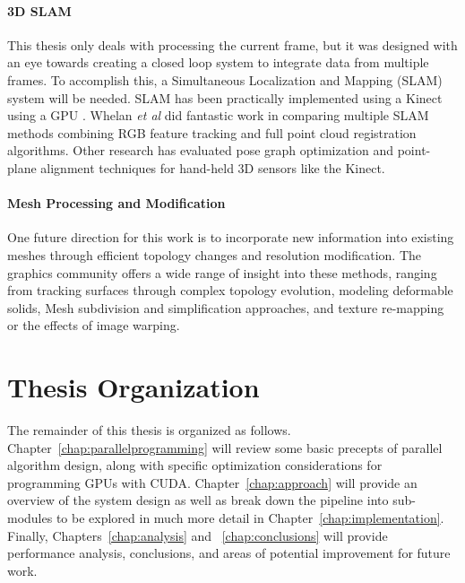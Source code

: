 \paragraph{3D SLAM}
This thesis only deals with processing the current frame, but it was designed with an eye towards creating a closed loop system to integrate data from multiple frames. To accomplish this, a Simultaneous Localization and Mapping (SLAM) system will be needed. SLAM has been practically implemented using a Kinect using a GPU \cite{quadrocopterslam,steinbrucker2011real}. Whelan \textit{et al} did fantastic work in comparing multiple SLAM methods combining RGB feature tracking and full point cloud registration algorithms\cite{whelan:odometry}. Other research has evaluated pose graph optimization \cite{Endres} and point-plane alignment\cite{Taguchi} techniques for hand-held 3D sensors like the Kinect.
\paragraph{Mesh Processing and Modification}
One future direction for this work is to incorporate new information into existing meshes through efficient topology changes and resolution modification. The graphics community offers a wide range of insight into these methods, ranging from tracking surfaces through complex topology evolution\cite{bojsen2012tracking}, modeling deformable solids\cite{Sifakis:2007:HSO}, Mesh subdivision and simplification approaches\cite{Puppo:2009:RS}, and texture re-mapping or the effects of image warping\cite{heckbert,heckbert:pixarsurvey,wang:optimaltexture,Oka:RealtimeManipulation,Guo:2008:MOR}.
\section{Thesis Organization} %
The remainder of this thesis is organized as follows. Chapter~\ref{chap:parallelprogramming} will review some basic precepts of parallel algorithm design, along with specific optimization considerations for programming GPUs with CUDA. Chapter~\ref{chap:approach} will provide an overview of the system design as well as break down the pipeline into sub-modules to be explored in much more detail in Chapter~\ref{chap:implementation}. Finally, Chapters~\ref{chap:analysis} and ~\ref{chap:conclusions} will provide performance analysis, conclusions, and areas of potential improvement for future work.